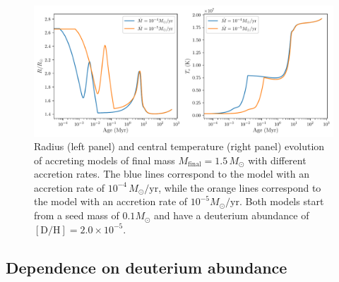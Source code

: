 \documentclass[12pt,a4paper]{article}
\newcommand{\mr}{\mathrm}
\begin{document}
\begin{figure}
  \centering  
  \includegraphics[width=.98\textwidth,keepaspectratio]{acc_rate_m1p5.pdf}
  \caption{Radius (left panel) and central temperature (right panel) evolution of accreting models of final mass $M_\mr{final} = 1.5\,M_\odot$ with different accretion rates. The blue lines correspond to the model with an accretion rate of $10^{-4}\,M_\odot/\mr{yr}$, while the orange lines correspond to the model with an accretion rate of $10^{-5} M_\odot/\mr{yr}$. Both models start from a seed mass of $0.1 M_\odot$ and have a deuterium abundance of $[\mr{D/H}] = 2.0\times 10^{-5}$.}
  \label{fig:comp_acc_rate_m1p5}
\end{figure}

\subsection{Dependence on deuterium abundance}
\label{sec:deuterium_abundance}
\end{document}
